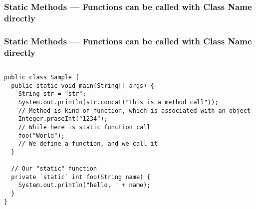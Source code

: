 \documentclass[en, 11pt, xcolor=dvipsnames]{beamer}
\begin{document}
\subsubsection{Static Methods --- Functions can be called with Class Name directly}
\begin{frame}[fragile]
	\frametitle{Static Methods --- Functions can be called with Class Name directly}



	\begin{columns}[c]
		\begin{column}{0.98\textwidth}

			\begin{lstlisting}[style=Java]
public class Sample {
  public static void main(String[] args) {
    String str = "str";
    System.out.println(str.concat("This is a method call"));
    // Method is kind of function, which is associated with an object
    Integer.praseInt("1234");
    // While here is static function call
    foo("World");
    // We define a function, and we call it
  }

  // Our "static" function
  private `static` int foo(String name) {
    System.out.println("hello, " + name);
  }
}
\end{lstlisting}

		\end{column}
	\end{columns}

\end{frame}
\end{document}
